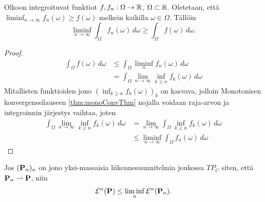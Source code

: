 \begin{lemma}\label{le:intRFctLSC} 
    Olkoon integroituvat funktiot $f, f_n : \Omega \to \R$, $\Omega \subset \R$. Oletetaan, että $\displaystyle \liminf_{n\to\infty} f_n(\omega) \ge f(\omega)$ melkein kaikilla $\omega \in \Omega$. Tällöin
        \begin{equation*}
            \liminf_{n\to \infty} \int_\Omega f_n(\omega) \, d\omega \ge \int_\Omega f(\omega)\, d\omega.
        \end{equation*}
\end{lemma}
\begin{proof}
    \begin{align*}
        \int_\Omega f(\omega) \, d\omega &\le \int_\Omega \liminf_n f_n(\omega) \, d\omega \\
        & = \int_\Omega \lim_{n\to\infty} \inf_{k\ge n} f_k(\omega) \, d\omega
    \end{align*}
 Mitallisten funktioiden jono $(\inf_{k\ge n}f_k(\omega))_k$ on kasvava, jolloin Monotonisen konvergenssilauseen \ref{thm:monoConvThm} nojalla voidaan raja-arvon ja integroinnin järjestys vaihtaa, joten
    \begin{align*}
         \int_\Omega \lim_{n\to\infty} \inf_{k\ge n} f_k(\omega) \, d\omega &= \lim_{n\to\infty} \int_\Omega \inf_{k\ge n} f_k(\omega) \, d\omega \\
        &\le  \liminf_{n\to\infty} \int_\Omega f_n(\omega) \, d\omega 
    \end{align*}
\end{proof}

\begin{theorem}\label{thm:energyLSC}
    Jos $(\P_n)_n$ on jono yksi-massaisia liikennesuunnitelmia joukossa $TP_C$ siten, että $\P_n \rightharpoonup \P$, niin
        \begin{equation*}
            \E^\alpha(\P) \le \liminf_n \E^\alpha(\P_n).
        \end{equation*}
\end{theorem}

